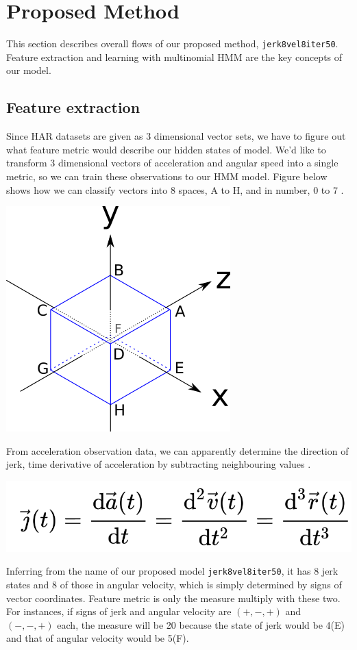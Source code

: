 \documentclass[10pt,twocolumn,letterpaper]{article}
\begin{document}
\section{Proposed Method}
This section describes overall flows of our proposed method, \texttt{jerk8vel8iter50}. Feature extraction and learning with multinomial HMM are the key concepts of our model.

\subsection{Feature extraction}
Since HAR datasets are given as 3 dimensional vector sets, we have to figure out what feature metric would describe our hidden states of model. We'd like to transform 3 dimensional vectors of acceleration and angular speed into a single metric, so we can train these observations to our HMM model. Figure below shows how we can classify vectors into 8 spaces, A to H, and in number, 0 to 7 \wrt.

\begin{center}
\includegraphics[width=0.5\linewidth]{./coordinate.png}
\end{center}

From acceleration observation data, we can apparently determine the direction of jerk, time derivative of acceleration by subtracting neighbouring values \cite{jerkwiki}.

\begin{center}
\includegraphics[width=0.6\linewidth]{./jerk.png}
\end{center}

Inferring from the name of our proposed model \texttt{jerk8vel8iter50}, it has 8 jerk states and 8 of those in angular velocity, which is simply determined by signs of vector coordinates. Feature metric is only the measure multiply with these two. For instances, if signs of jerk and angular velocity are $(+,-,+)$ and $(-,-,+)$ each, the measure will be 20 because the state of jerk would be 4(E) and that of angular velocity would be 5(F).
\end{document}
